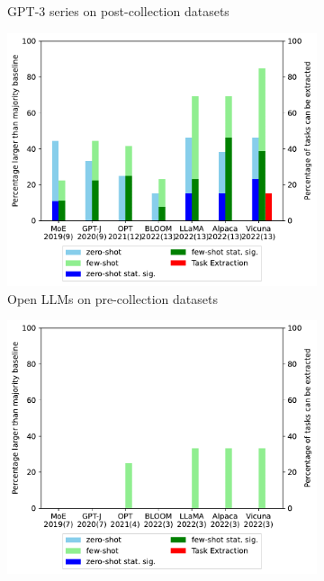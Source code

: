 \documentclass[letterpaper]{article} %
\begin{document}
\begin{figure}[t]
\begin{subfigure}[b]{0.45\textwidth}
            \caption[]%
            {GPT-3 series on post-collection datasets}    
            \label{fig:Few shot performance for old datasets1}
        \end{subfigure}
        \begin{subfigure}[b]{0.45\textwidth}
            \centering
            \includegraphics[scale=0.45]{img/old-dataset-percentage-recent-llm.pdf}
            \caption[]%
            {Open LLMs on pre-collection datasets} 
            \label{fig:Zero shot performance for old datasets2}
        \end{subfigure}
        \begin{subfigure}[b]{0.45\textwidth}   
            \centering 
            \includegraphics[scale=0.45]{img/new-dataset-percentage-recent-llm.pdf}

\end{subfigure}
\end{figure}
\end{document}
